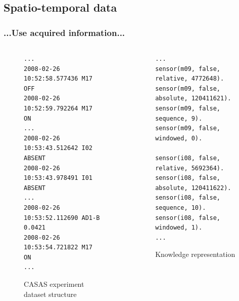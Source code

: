 \documentclass[09pt]{beamer}
\begin{document}
\subsection{Spatio-temporal data}
\begin{frame}[fragile]
\frametitle{...Use acquired information...}
{\tiny
\begin{columns}
\begin{column}{5.4cm}
\begin{example}
\begin{figure}
\lstset{
captionpos=b,
language=HTML,
breaklines=true,
float=tb,
basicstyle=\tiny
}
\begin{lstlisting}
...
2008-02-26 10:52:58.577436 M17   OFF
2008-02-26 10:52:59.792264 M17   ON
...
2008-02-26 10:53:43.512642 I02   ABSENT
2008-02-26 10:53:43.978491 I01   ABSENT
...
2008-02-26 10:53:52.112690 AD1-B 0.0421
2008-02-26 10:53:54.721822 M17   ON
...
\end{lstlisting}
\caption{\tiny CASAS experiment dataset structure\label{lst:data}}
\end{figure}
\end{example}
\end{column}
\pause
\begin{column}{5.4cm}
\begin{example}
\begin{figure}
\lstset{
captionpos=b,
language=HTML,
breaklines=true,
float=tb,
basicstyle=\tiny
}
\begin{lstlisting}
...
sensor(m09, false, relative, 4772648).
sensor(m09, false, absolute, 120411621).
sensor(m09, false, sequence, 9).
sensor(m09, false, windowed, 0).

sensor(i08, false, relative, 5692364).
sensor(i08, false, absolute, 120411622).
sensor(i08, false, sequence, 10).
sensor(i08, false, windowed, 1).
...
\end{lstlisting}
\tiny\caption{\tiny Knowledge representation\label{lst:knowledge}}
\end{figure}
\end{example}
\end{column}
\end{columns}
}
\end{frame}
\end{document}
